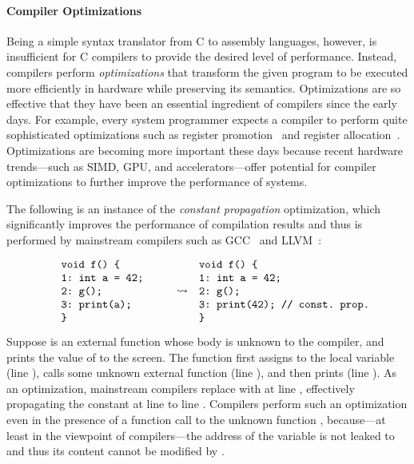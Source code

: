 \paragraph{Compiler Optimizations}

Being a simple syntax translator from C to assembly languages, however, is insufficient for C
compilers to provide the desired level of performance.  Instead, compilers perform
\emph{optimizations} that transform the given program to be executed more efficiently in hardware
while preserving its semantics.  Optimizations are so effective that they have been an essential
ingredient of compilers since the early days.  For example, every system programmer expects a
compiler to perform quite sophisticated optimizations such as register promotion~\cite{mem2reg} and
register allocation~\cite{regalloc}.  Optimizations are becoming more important these days because
recent hardware trends---such as SIMD, GPU, and accelerators---offer potential for compiler
optimizations to further improve the performance of systems.

The following is an instance of the \emph{constant propagation} optimization, which significantly
improves the performance of compilation results and thus is performed by mainstream compilers such
as GCC~\cite{gcc} and LLVM~\cite{llvm}:

%
\[\begin{array}{rcl}
\begin{minipage}{0.27\textwidth}
\begin{verbatim}
void f() {
1: int a = 42;
2: g();
3: print(a);
}
\end{verbatim}
\end{minipage}
&
\optarrow
&
\begin{minipage}{0.4\textwidth}
\begin{verbatim}
void f() {
1: int a = 42;
2: g();
3: print(42); // const. prop.
}
\end{verbatim}
\end{minipage}
\end{array}\]

\noindent Suppose  is an external function whose body is unknown to the compiler, and
 prints the value of  to the screen.  The function  first assigns
 to the local variable  (line ), calls some unknown external function
 (line ), and then prints  (line ).  As an optimization,
mainstream compilers replace  with  at line , effectively propagating the
constant  at line  to line .  Compilers perform such an optimization even
in the presence of a function call to the unknown function , because---at least in the
viewpoint of compilers---the address of the variable  is not leaked to  and thus
its content cannot be modified by .

